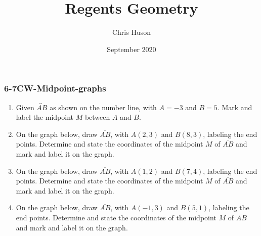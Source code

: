 \documentclass[12pt, twoside]{article}
\title{Regents Geometry}
\author{Chris Huson}
\date{September 2020}
\begin{document}
\subsubsection*{6-7CW-Midpoint-graphs}
\begin{enumerate}
\item Given $\overleftrightarrow{AB}$ as shown on the number line, with $A=-3$ and $B=5$. Mark and label the midpoint $M$ between $A$ and $B$.\\[20pt] %
  
\item On the graph below, draw $\overline{AB}$, with $A(2,3)$ and $B(8,3)$, labeling the end points. Determine and state the coordinates of the midpoint $M$ of $\overline{AB}$ and mark and label it on the graph.
  \begin{flushright}
  \end{flushright}
  
  
\item On the graph below, draw $\overline{AB}$, with $A(1,2)$ and $B(7,4)$, labeling the end points. Determine and state the coordinates of the midpoint $M$ of $\overline{AB}$ and mark and label it on the graph.
  \begin{flushright}
  \end{flushright}
  \vspace{1cm}

\newpage
\item On the graph below, draw $\overline{AB}$, with $A(-1,3)$ and $B(5,1)$, labeling the end points. Determine and state the coordinates of the midpoint $M$ of $\overline{AB}$ and mark and label it on the graph.
  \begin{flushright}
  \end{flushright}


\end{enumerate}
\end{document}
